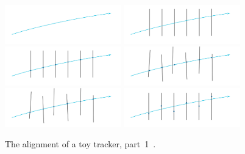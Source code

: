 \begin{figure}[htb]
    \begin{center}
          \includegraphics[width=0.45\textwidth]{../figs/Alignment/toyTracker01.png}
          \includegraphics[width=0.45\textwidth]{../figs/Alignment/toyTracker02.png}
        \includegraphics[width=0.45\textwidth]{../figs/Alignment/toyTracker03.png}
        \includegraphics[width=0.45\textwidth]{../figs/Alignment/toyTracker04.png}
        \includegraphics[width=0.45\textwidth]{../figs/Alignment/toyTracker05.png}
        \includegraphics[width=0.45\textwidth]{../figs/Alignment/toyTracker06.png}
    \end{center}
    \caption{The alignment of a toy tracker, part~1~\cite{ref_Frank_presentation}.}
    \label{fig:toyTracker_part1}
\end{figure}

